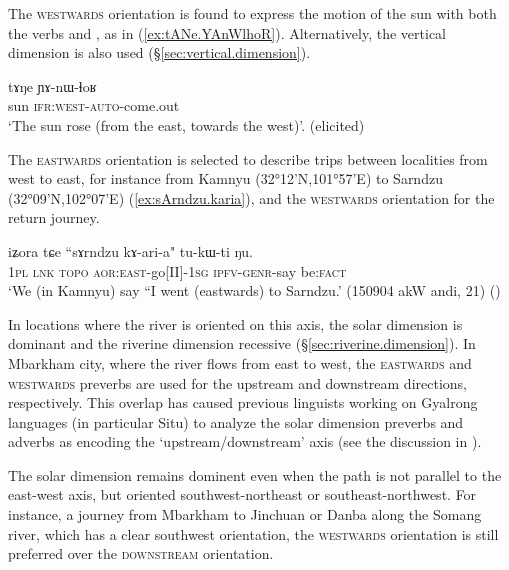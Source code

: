 The \textsc{westwards} orientation is found to express the motion of the sun with both the verbs  and , as in (\ref{ex:tANe.YAnWlhoR}). Alternatively, the vertical dimension is also used (§\ref{sec:vertical.dimension}).

\begin{exe}
\ex \label{ex:tANe.YAnWlhoR}
\gll tɤŋe ɲɤ-nɯ-ɬoʁ \\
sun \textsc{ifr}:\textsc{west}-\textsc{auto}-come.out \\
\glt `The sun rose (from the east, towards the west)'. (elicited)
\end{exe}

The \textsc{eastwards} orientation is selected to describe trips between localities from west to east, for instance from Kamnyu (32°12'N,101°57'E) to Sarndzu (32°09'N,102°07'E) (\ref{ex:sArndzu.karia}), and the \textsc{westwards} orientation for the return journey.

\begin{exe}
\ex \label{ex:sArndzu.karia}
\gll  iʑora tɕe ``sɤrndzu kɤ-ari-a" tu-kɯ-ti ŋu. \\
\textsc{1pl} \textsc{lnk}  \textsc{topo} \textsc{aor}:\textsc{east}-go[II]-\textsc{1sg} \textsc{ipfv}-\textsc{genr}-say be:\textsc{fact} \\
\glt `We (in Kamnyu) say ``I went (eastwards) to Sarndzu.' (150904 akW andi, 21) ()
\end{exe}

In locations where the river is oriented on this axis, the solar dimension is dominant and the riverine dimension recessive (§\ref{sec:riverine.dimension}). In Mbarkham city, where the river flows from east to west, the \textsc{eastwards} and \textsc{westwards} preverbs are used for the upstream and downstream directions, respectively. This overlap has caused previous linguists working on Gyalrong languages (in particular Situ) to analyze the solar dimension preverbs and adverbs as encoding the `upstream/downstream' axis (see the discussion in \citealt{lin02dimension}).

The solar dimension remains dominent even when the path is not parallel to the east-west axis, but oriented southwest-northeast or southeast-northwest. For instance, a journey from Mbarkham to Jinchuan or Danba along the Somang river, which has a clear southwest orientation, the \textsc{westwards} orientation is still preferred over the \textsc{downstream} orientation.

